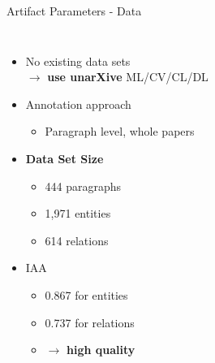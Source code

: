 \documentclass[en,16:9,smallfoot]{sdqbeamer}
\begin{document}
   \begin{frame}{Artifact Parameters - Data}
   \begin{columns}
           \begin{itemize}
               \item No existing data sets\\$\rightarrow$ \textbf{use unarXive} ML/CV/CL/DL
               \item Annotation approach
               \begin{itemize}
                  \item Paragraph level, whole papers
               \end{itemize}
               \item \textbf{Data Set Size}
               \begin{itemize}
                  \item 444 paragraphs
                  \item 1,971 entities %
                  \item 614 relations
               \end{itemize}
               \item IAA
               \begin{itemize}
                  \item 0.867 for entities
                  \item 0.737 for relations
                  \item $\rightarrow$ \textbf{high quality}
               \end{itemize}
           \end{itemize}
\end{columns}
\end{frame}
\end{document}
